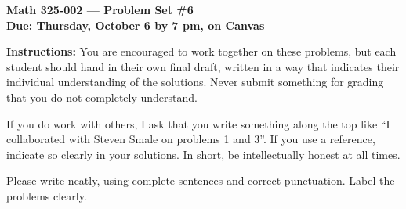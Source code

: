 \documentclass{amsart}
\begin{document}
\begin{center}
{\large\bfseries
Math 325-002 --- Problem Set \#6 \\
Due: Thursday, October 6 by 7 pm, on Canvas}
\end{center}





{\bf Instructions:} You are encouraged to work together on these
problems, but each student should hand in their own final draft,
written in a way that indicates their individual understanding of
the solutions. Never submit something for grading
that you do not completely understand. 

If you do work with others, I ask that you write something along the
top like ``I collaborated with Steven Smale on problems 1 and 3''.
If you use a reference, indicate so clearly in your solutions. 
In short, be intellectually
honest at all times.

Please write neatly, using complete sentences and correct
punctuation. Label the problems clearly. 
\end{document}
